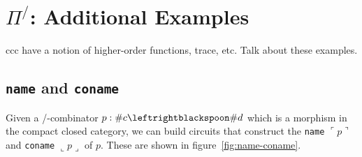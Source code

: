 \documentclass[a4paper,USenglish]{lipics-v2016-utf8x}
\begin{document}
\section{$\Pi^/$: Additional Examples}

ccc have a notion of higher-order functions, trace, etc. Talk about these
examples.

\subsection{\texttt{name} and \texttt{coname}}

Given a \textrm{/-combinator} $p : \#c \leftrightblackspoon \#d$ which is a
morphism in the compact closed category, we can build circuits that construct
the \texttt{name} $\ulcorner{p}\urcorner$ and \texttt{coname}
$\llcorner{p}\lrcorner$ of $p$. These are shown in figure~\ref{fig:name-coname}.
\end{document}
